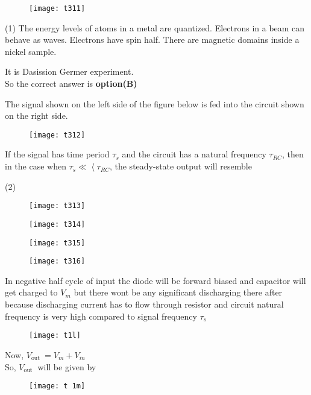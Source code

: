 \begin{questions}
\begin{figure}[H]
	\centering
	\texttt{[image: t311]}
\end{figure}
\begin{tasks}(1)
	\task[\textbf{A.}]   The energy levels of atoms in a metal are quantized.
	\task[\textbf{B.}] Electrons in a beam can behave as waves.
	\task[\textbf{C.}] Electrons have spin half.
	\task[\textbf{D.}] There are magnetic domains inside a nickel sample.
\end{tasks}
\begin{answer}
	It is Dasission Germer experiment.\\
	So the correct answer is \textbf{option(B)}
\end{answer}
\begin{minipage}{\textwidth}
	\question The signal shown on the left side of the figure below is fed into the circuit shown on the right side.\\
	\begin{figure}[H]
		\centering
		\texttt{[image: t312]}
	\end{figure}
	If the signal has time period $\tau_{s}$ and the circuit has a natural frequency $\tau_{R C}$, then in the case when $\tau_{s} \ll\left\langle\tau_{R C}\right.$, the steady-state output will resemble
\end{minipage}
\begin{tasks}(2)
	\task[\textbf{A.}] \begin{figure}[H]
		\centering
		\texttt{[image: t313]}
	\end{figure}
	\task[\textbf{B.}] \begin{figure}[H]
		\centering
		\texttt{[image: t314]}
	\end{figure}
	\task[\textbf{C.}] \begin{figure}[H]
		\centering
		\texttt{[image: t315]}
	\end{figure}
	\task[\textbf{D.}] \begin{figure}[H]
		\centering
		\texttt{[image: t316]}
	\end{figure}
\end{tasks}
\begin{answer}
In negative half cycle of input the diode will be forward biased and capacitor will get charged to $V_{m}$ but there wont be any significant discharging there after because discharging current has to flow through resistor and circuit natural frequency is very high compared to signal frequency $\tau_{s}$
\begin{figure}[H]
	\centering
	\texttt{[image: t1l]}
\end{figure}
Now, $V_{\text {out }}=V_{m}+V_{i n}$\\
So, $V_{\text {out }}$ will be given by	\\
\begin{figure}[H]
	\centering
	\texttt{[image: t 1m]}
	

\end{figure}
\end{answer}
\end{questions}
